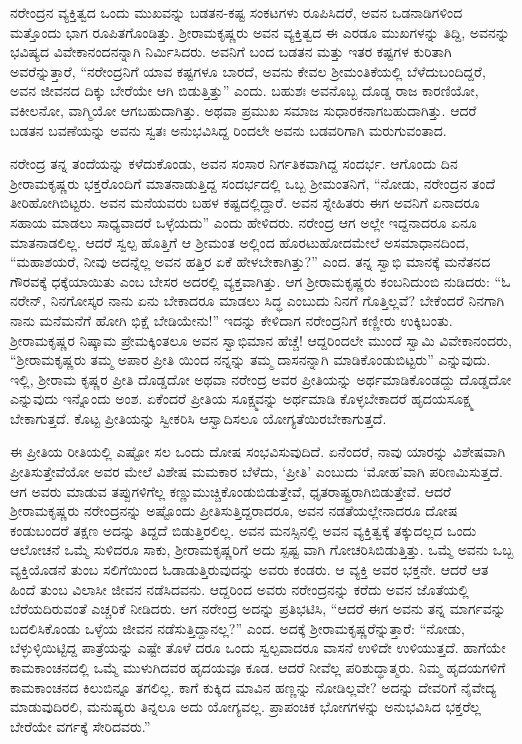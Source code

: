ನರೇಂದ್ರನ ವ್ಯಕ್ತಿತ್ವದ ಒಂದು ಮುಖವನ್ನು ಬಡತನ-ಕಷ್ಟ ಸಂಕಟಗಳು ರೂಪಿಸಿದರೆ, ಅವನ ಒಡನಾಡಿಗಳಿಂದ ಮತ್ತೊಂದು ಭಾಗ ರೂಪಿತಗೊಂಡಿತ್ತು. ಶ್ರೀರಾಮಕೃಷ್ಣರು ಅವನ ವ್ಯಕ್ತಿತ್ವದ ಈ ಎರಡೂ ಮುಖಗಳನ್ನು ತಿದ್ದಿ, ಅವನನ್ನು ಭವಿಷ್ಯದ ವಿವೇಕಾನಂದನನ್ನಾಗಿ ನಿರ್ಮಿಸಿದರು. ಅವನಿಗೆ ಬಂದ ಬಡತನ ಮತ್ತು ಇತರ ಕಷ್ಟಗಳ ಕುರಿತಾಗಿ ಅವರೆನ್ನುತ್ತಾರೆ, “ನರೇಂದ್ರನಿಗೆ ಯಾವ ಕಷ್ಟಗಳೂ ಬಾರದೆ, ಅವನು ಕೇವಲ ಶ್ರೀಮಂತಿಕೆಯಲ್ಲಿ ಬೆಳೆದುಬಂದಿದ್ದರೆ, ಅವನ ಜೀವನದ ದಿಕ್ಕು ಬೇರೆಯೇ ಆಗಿ ಬಿಡುತ್ತಿತ್ತು” ಎಂದು. ಬಹುಶಃ ಅವನೊಬ್ಬ ದೊಡ್ಡ ರಾಜ ಕಾರಣಿಯೋ, ವಕೀಲನೋ, ವಾಗ್ಮಿಯೋ ಆಗಬಹುದಾಗಿತ್ತು. ಅಥವಾ ಪ್ರಮುಖ ಸಮಾಜ ಸುಧಾರಕನಾಗಬಹುದಾಗಿತ್ತು. ಆದರೆ ಬಡತನ ಬವಣೆಯನ್ನು ಅವನು ಸ್ವತಃ ಅನುಭವಿಸಿದ್ದ ರಿಂದಲೇ ಅವನು ಬಡವರಿಗಾಗಿ ಮರುಗುವಂತಾದ.

ನರೇಂದ್ರ ತನ್ನ ತಂದೆಯನ್ನು ಕಳೆದುಕೊಂಡು, ಅವನ ಸಂಸಾರ ನಿರ್ಗತಿಕವಾಗಿದ್ದ ಸಂದರ್ಭ. ಆಗೊಂದು ದಿನ ಶ್ರೀರಾಮಕೃಷ್ಣರು ಭಕ್ತರೊಂದಿಗೆ ಮಾತನಾಡುತ್ತಿದ್ದ ಸಂದರ್ಭದಲ್ಲಿ ಒಬ್ಬ ಶ್ರೀಮಂತನಿಗೆ, “ನೋಡು, ನರೇಂದ್ರನ ತಂದೆ ತೀರಿಹೋಗಿಬಿಟ್ಟರು. ಅವನ ಮನೆಯವರು ಬಹಳ ಕಷ್ಟದಲ್ಲಿದ್ದಾರೆ. ಅವನ ಸ್ನೇಹಿತರು ಈಗ ಅವನಿಗೆ ಏನಾದರೂ ಸಹಾಯ ಮಾಡಲು ಸಾಧ್ಯವಾದರೆ ಒಳ್ಳೆಯದು” ಎಂದು ಹೇಳಿದರು. ನರೇಂದ್ರ ಆಗ ಅಲ್ಲೇ ಇದ್ದನಾದರೂ ಏನೂ ಮಾತನಾಡಲಿಲ್ಲ. ಆದರೆ ಸ್ವಲ್ಪ ಹೊತ್ತಿಗೆ ಆ ಶ್ರೀಮಂತ ಅಲ್ಲಿಂದ ಹೊರಟುಹೋದಮೇಲೆ ಅಸಮಾಧಾನದಿಂದ, “ಮಹಾಶಯರೆ, ನೀವು ಅದನ್ನೆಲ್ಲ ಅವನ ಹತ್ತಿರ ಏಕೆ ಹೇಳಬೇಕಾಗಿತ್ತು?” ಎಂದ. ತನ್ನ ಸ್ವಾಭಿ ಮಾನಕ್ಕೆ ಮನೆತನದ ಗೌರವಕ್ಕೆ ಧಕ್ಕೆಯಾಯಿತು ಎಂಬ ಬೇಸರ ಅದರಲ್ಲಿ ವ್ಯಕ್ತವಾಗಿತ್ತು. ಆಗ ಶ್ರೀರಾಮಕೃಷ್ಣರು ಕಂಬನಿದುಂಬಿ ನುಡಿದರು: “ಓ ನರೇನ್, ನಿನಗೋಸ್ಕರ ನಾನು ಏನು ಬೇಕಾದರೂ ಮಾಡಲು ಸಿದ್ಧ ಎಂಬುದು ನಿನಗೆ ಗೊತ್ತಿಲ್ಲವೆ? ಬೇಕೆಂದರೆ ನಿನಗಾಗಿ ನಾನು ಮನೆಮನೆಗೆ ಹೋಗಿ ಭಿಕ್ಷೆ ಬೇಡಿಯೇನು!” ಇದನ್ನು ಕೇಳಿದಾಗ ನರೇಂದ್ರನಿಗೆ ಕಣ್ಣೀರು ಉಕ್ಕಿಬಂತು. ಶ್ರೀರಾಮಕೃಷ್ಣರ ನಿಷ್ಕಾಮ ಪ್ರೇಮಕ್ಕಿಂತಲೂ ಅವನ ಸ್ವಾಭಿಮಾನ ಹೆಚ್ಚೆ! ಆದ್ದರಿಂದಲೇ ಮುಂದೆ ಸ್ವಾಮಿ ವಿವೇಕಾನಂದರು, “ಶ್ರೀರಾಮಕೃಷ್ಣರು ತಮ್ಮ ಅಪಾರ ಪ್ರೀತಿ ಯಿಂದ ನನ್ನನ್ನು ತಮ್ಮ ದಾಸನನ್ನಾಗಿ ಮಾಡಿಕೊಂಡುಬಿಟ್ಟರು” ಎನ್ನುವುದು. ಇಲ್ಲಿ, ಶ್ರೀರಾಮ ಕೃಷ್ಣರ ಪ್ರೀತಿ ದೊಡ್ಡದೋ ಅಥವಾ ನರೇಂದ್ರ ಅವರ ಪ್ರೀತಿಯನ್ನು ಅರ್ಥಮಾಡಿಕೊಂಡದ್ದು ದೊಡ್ಡದೋ ಎನ್ನುವುದು ಇನ್ನೊಂದು ಅಂಶ. ಏಕೆಂದರೆ ಪ್ರೀತಿಯ ಸೂಕ್ಷ್ಮವನ್ನು ಅರ್ಥಮಾಡಿ ಕೊಳ್ಳಬೇಕಾದರೆ ಹೃದಯಸೂಕ್ಷ್ಮ ಬೇಕಾಗುತ್ತದೆ. ಕೊಟ್ಟ ಪ್ರೀತಿಯನ್ನು ಸ್ವೀಕರಿಸಿ ಆಸ್ವಾದಿಸಲೂ ಯೋಗ್ಯತೆಯಿರಬೇಕಾಗುತ್ತದೆ.

ಈ ಪ್ರೀತಿಯ ರೀತಿಯಲ್ಲಿ ಎಷ್ಟೋ ಸಲ ಒಂದು ದೋಷ ಸಂಭವಿಸುವುದಿದೆ. ಏನೆಂದರೆ, ನಾವು ಯಾರನ್ನು ವಿಶೇಷವಾಗಿ ಪ್ರೀತಿಸುತ್ತೇವೆಯೋ ಅವರ ಮೇಲೆ ವಿಶೇಷ ಮಮಕಾರ ಬೆಳೆದು, ‘ಪ್ರೀತಿ’ ಎಂಬುದು ‘ಮೋಹ’ವಾಗಿ ಪರಿಣಮಿಸುತ್ತದೆ. ಆಗ ಅವರು ಮಾಡುವ ತಪ್ಪುಗಳಿಗೆಲ್ಲ ಕಣ್ಣುಮುಚ್ಚಿಕೊಂಡುಬಿಡುತ್ತೇವೆ, ಧೃತರಾಷ್ಟ್ರರಾಗಿಬಿಡುತ್ತೇವೆ. ಆದರೆ ಶ್ರೀರಾಮಕೃಷ್ಣರು ನರೇಂದ್ರನನ್ನು ಅಷ್ಟೊಂದು ಪ್ರೀತಿಸುತ್ತಿದ್ದರಾದರೂ, ಅವನ ನಡತೆಯಲ್ಲೇನಾದರೂ ದೋಷ ಕಂಡುಬಂದರೆ ತಕ್ಷಣ ಅದನ್ನು ತಿದ್ದದೆ ಬಿಡುತ್ತಿರಲಿಲ್ಲ. ಅವನ ಮನಸ್ಸಿನಲ್ಲಿ ಅವನ ವ್ಯಕ್ತಿತ್ವಕ್ಕೆ ತಕ್ಕುದಲ್ಲದ ಒಂದು ಆಲೋಚನೆ ಒಮ್ಮೆ ಸುಳಿದರೂ ಸಾಕು, ಶ್ರೀರಾಮಕೃಷ್ಣರಿಗೆ ಅದು ಸ್ಪಷ್ಟ ವಾಗಿ ಗೋಚರಿಸಿಬಿಡುತ್ತಿತ್ತು. ಒಮ್ಮೆ ಅವನು ಒಬ್ಬ ವ್ಯಕ್ತಿಯೊಡನೆ ತುಂಬ ಸಲಿಗೆಯಿಂದ ಓಡಾಡುತ್ತಿರುವುದನ್ನು ಅವರು ಕಂಡರು. ಆ ವ್ಯಕ್ತಿ ಅವರ ಭಕ್ತನೇ. ಆದರೆ ಆತ ಹಿಂದೆ ತುಂಬ ವಿಲಾಸೀ ಜೀವನ ನಡೆಸಿದವನು. ಆದ್ದರಿಂದ ಅವರು ನರೇಂದ್ರನನ್ನು ಕರೆದು ಅವನ ಜೊತೆಯಲ್ಲಿ ಬೆರೆಯದಿರುವಂತೆ ಎಚ್ಚರಿಕೆ ನೀಡಿದರು. ಆಗ ನರೇಂದ್ರ ಅದನ್ನು ಪ್ರತಿಭಟಿಸಿ, “ಆದರೆ ಈಗ ಅವನು ತನ್ನ ಮಾರ್ಗವನ್ನು ಬದಲಿಸಿಕೊಂಡು ಒಳ್ಳೆಯ ಜೀವನ ನಡೆಸುತ್ತಿದ್ದಾನಲ್ಲ?” ಎಂದ. ಅದಕ್ಕೆ ಶ್ರೀರಾಮಕೃಷ್ಣರೆನ್ನುತ್ತಾರೆ: “ನೋಡು, ಬೆಳ್ಳುಳ್ಳಿಯಿಟ್ಟಿದ್ದ ಪಾತ್ರೆಯನ್ನು ಎಷ್ಟೇ ತೊಳೆ ದರೂ ಒಂದು ಸ್ವಲ್ಪವಾದರೂ ವಾಸನೆ ಉಳಿದೇ ಉಳಿಯುತ್ತದೆ. ಹಾಗೆಯೇ ಕಾಮಕಾಂಚನದಲ್ಲಿ ಒಮ್ಮೆ ಮುಳುಗಿದವರ ಹೃದಯವೂ ಕೂಡ. ಆದರೆ ನೀವೆಲ್ಲ ಪರಿಶುದ್ಧಾತ್ಮರು. ನಿಮ್ಮ ಹೃದಯಗಳಿಗೆ ಕಾಮಕಾಂಚನದ ಕಿಲುಬಿನ್ನೂ ತಗಲಿಲ್ಲ. ಕಾಗೆ ಕುಕ್ಕಿದ ಮಾವಿನ ಹಣ್ಣನ್ನು ನೋಡಿಲ್ಲವೇ? ಅದನ್ನು ದೇವರಿಗೆ ನೈವೇದ್ಯ ಮಾಡುವುದಿರಲಿ, ಮನುಷ್ಯರು ತಿನ್ನಲೂ ಅದು ಯೋಗ್ಯವಲ್ಲ. ಪ್ರಾಪಂಚಿಕ ಭೋಗಗಳನ್ನು ಅನುಭವಿಸಿದ ಭಕ್ತರೆಲ್ಲ ಬೇರೆಯೇ ವರ್ಗಕ್ಕೆ ಸೇರಿದವರು.”

